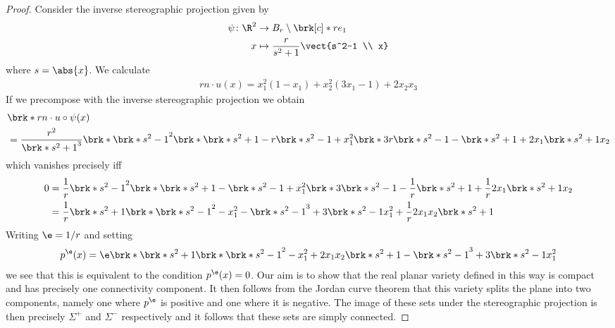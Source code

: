 \begin{proof}
  Consider the inverse stereographic projection given by 
  \begin{align*}
    \psi\colon \R^2&\to B_r\setminus\brk[c]*{re_1} \\
    x&\mapsto \frac{r}{s^2+1}\vect{s^2-1 \\ x}
  \end{align*}
  where $s=\abs{x}$. We calculate
  \begin{align*}
    rn\cdot u(x) = x_1^2(1-x_1)+x_2^2(3x_1-1)+2x_2x_3
  \end{align*}
  If we precompose with the inverse stereographic projection we obtain
  \begin{align*}
    &\brk*{rn\cdot u}\circ\psi (x) \\
    &= \frac{r^2}{\brk*{s^2+1}^3}\brk*{\brk*{s^2-1}^2\brk*{\brk*{s^2+1}-r\brk*{s^2-1}}+x_1^2\brk*{3r\brk*{s^2-1}-\brk*{s^2+1}}+2x_1\brk*{s^2+1}x_2}
  \end{align*}
  which vanishes precisely iff
  \begin{align*}
    0&=\frac{1}{r}\brk*{s^2-1}^2\brk*{\brk*{s^2+1}-\brk*{s^2-1}}+x_1^2\brk*{3\brk*{s^2-1}-\frac{1}{r}\brk*{s^2+1}}+\frac{1}{r}2x_1\brk*{s^2+1}x_2 \\
    &=\frac{1}{r}\brk*{s^2+1}\brk*{\brk*{s^2-1}^2-x_1^2}-\brk*{s^2-1}^3+3\brk*{s^2-1}x_1^2+\frac{1}{r}2x_1x_2\brk*{s^2+1}
  \end{align*}
  Writing $\e=1/r$ and setting
  \begin{align*}
    p^\e(x)=\e\brk*{\brk*{s^2+1}\brk*{\brk*{s^2-1}^2-x_1^2}+2x_1x_2\brk*{s^2+1}}-\brk*{s^2-1}^3+3\brk*{s^2-1}x_1^2
  \end{align*}
  we see that this is equivalent to the condition $p^\e(x)=0$.
  Our aim is to show that the real planar variety defined in this way is compact and has precisely one connectivity component.
  It then follows from the Jordan curve theorem that this variety splits the plane into two components, namely one where 
  $p^\e$ is positive and one where it is negative. The image of these sets under the stereographic projection is then precisely
  $\Sigma^+$ and $\Sigma^-$ respectively and it follows that these sets are simply connected.


\end{proof}
